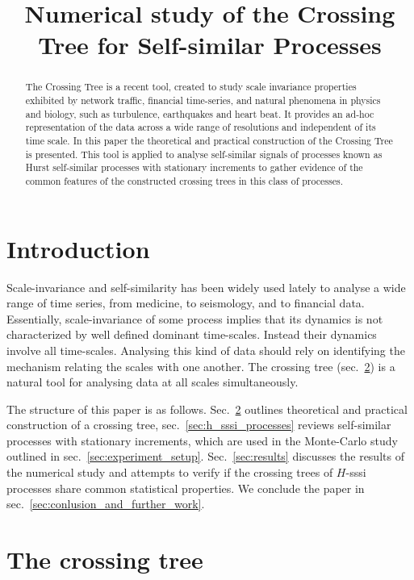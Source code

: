 \documentclass[a4paper]{article}
\title{Numerical study of the Crossing Tree for Self-similar Processes}
\begin{document}
\maketitle

\begin{abstract}
The Crossing Tree is a recent tool, created to study scale invariance properties
exhibited by network traffic, financial time-series, and natural phenomena in physics
and biology, such as turbulence, earthquakes and heart beat. It provides an ad-hoc
representation of the data across a wide range of resolutions and independent of
its time scale. In this paper the theoretical and practical construction of the Crossing
Tree is presented. This tool is applied to analyse self-similar signals of processes
known as Hurst self-similar processes with stationary increments to gather evidence 
of the common features of the constructed crossing trees in this class of processes.
\end{abstract}


\section{Introduction} %
\label{sec:introduction}

Scale-invariance and self-similarity has been widely used lately to analyse a wide
range of time series, from medicine, to seismology, and to financial data. Essentially,
scale-invariance of some process implies that its dynamics is not characterized
by well defined dominant time-scales. Instead their dynamics involve all time-scales.
Analysing this kind of data should rely on identifying the mechanism relating the
scales with one another. The crossing tree (sec.~\ref{sec:the_crossing_tree}) is
a natural tool for analysing data at all scales simultaneously.

The structure of this paper is as follows. Sec.~\ref{sec:the_crossing_tree} outlines
theoretical and practical construction of a crossing tree, sec.~\ref{sec:h_sssi_processes}
reviews self-similar processes with stationary increments, which are used in the
Monte-Carlo study outlined in sec.~\ref{sec:experiment_setup}. Sec.~\ref{sec:results}
discusses the results of the numerical study and attempts to verify if the crossing
trees of $H$-sssi processes share common statistical properties. We conclude the paper
in sec.~\ref{sec:conlusion_and_further_work}.


\section{The crossing tree} %
\label{sec:the_crossing_tree}
\end{document}
